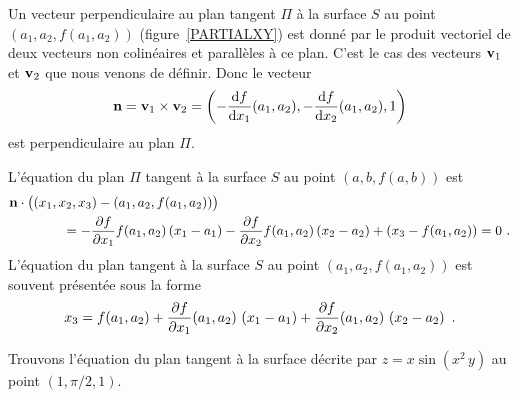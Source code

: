 {%


Un vecteur perpendiculaire au plan tangent $\Pi$ à la surface $S$ au point
$(a_1,a_2,f(a_1,a_2))$ (figure~\ref{PARTIALXY}) est donné par le produit
vectoriel de deux vecteurs non colinéaires et parallèles à ce plan.  C'est le
cas des vecteurs $\mathbf{v}_1$ et $\mathbf{v}_2$ que nous venons de définir.  Donc
le vecteur
\[
\mathbf{n}= \mathbf{v}_1 \times \mathbf{v}_2
= 
\left(-\frac{\mathrm{d}f}{\mathrm{d}x_1}(a_1,a_2), -\frac{\mathrm{d}f}{\mathrm{d}x_2}(a_1,a_2), 1 \right)
\]
est perpendiculaire au plan $\Pi$.

L'équation du plan $\Pi$ tangent à la surface $S$
au point $(a,b,f(a,b))$ est
\begin{align*}
&\mathbf{n} \cdot \big( (x_1,x_2,x_3)-(a_1,a_2,f(a_1,a_2)) \big)  \\
& \qquad \qquad = -\frac{\partial f}{\partial x_1}f(a_1,a_2) \left(x_1-a_1\right)
- \frac{\partial f}{\partial x_2}f(a_1,a_2) \left(x_2-a_2\right)
+ (x_3-f(a_1,a_2)) = 0 \ .
\end{align*}
L'équation du plan tangent à la surface $S$ au point
$(a_1,a_2,f(a_1,a_2))$ est souvent présentée sous la forme
\begin{equation}\label{planTANG}
x_3 = f(a_1,a_2) + \frac{\partial f}{\partial x_1}(a_1,a_2) \, \left(x_1-a_1\right)
+ \frac{\partial f}{\partial x_2}(a_1,a_2) \, \left(x_2-a_2\right) \ .
\end{equation}


\begin{egg}
Trouvons l'équation du plan tangent à la surface décrite par
$z=x\sin(x^2\, y)$ au point $(1,\pi/2,1)$.


\end{egg}}
